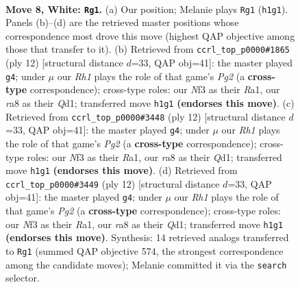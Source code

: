 \documentclass[11pt]{article}
\begin{document}
\begin{figure}[p]\centering
\begin{subfigure}{0.46\textwidth}\centering
\resizebox{\linewidth}{!}{%
\newchessgame
\chessboard[
  setfen={rnbqk2r/pp2bpp1/4pn2/2Pp3p/3P4/2N2N2/PP3PPP/R1BQKB1R w KQkq - 0 8},
  showmover=false,
  pgfstyle=straightmove, color=movearrow, markmove={h1-g1}
]}
\caption{}
\end{subfigure}\hfill
\begin{subfigure}{0.46\textwidth}\centering
\resizebox{\linewidth}{!}{%
\newchessgame
\chessboard[
  setfen={rnbqkb1r/1p3ppp/p2ppn2/8/3NP3/2N4P/PPP2PP1/R1BQKB1R w KQkq - 0 7},
  showmover=false,
  pgfstyle=straightmove, color=movearrow, markmove={g2-g4}
]}
\caption{}
\end{subfigure}
\\[4pt]
\begin{subfigure}{0.46\textwidth}\centering
\resizebox{\linewidth}{!}{%
\newchessgame
\chessboard[
  setfen={rnbqkb1r/1p3ppp/p2ppn2/8/3NP3/2N4P/PPP2PP1/R1BQKB1R w KQkq - 0 7},
  showmover=false,
  pgfstyle=straightmove, color=movearrow, markmove={g2-g4}
]}
\caption{}
\end{subfigure}\hfill
\begin{subfigure}{0.46\textwidth}\centering
\resizebox{\linewidth}{!}{%
\newchessgame
\chessboard[
  setfen={rnbqkb1r/1p3ppp/p2ppn2/8/3NP3/2N4P/PPP2PP1/R1BQKB1R w KQkq - 0 7},
  showmover=false,
  pgfstyle=straightmove, color=movearrow, markmove={g2-g4}
]}
\caption{}
\end{subfigure}
\caption{\textbf{Move 8, White: \texttt{Rg1}.} (a) Our position; Melanie plays \texttt{Rg1} (\texttt{h1g1}). Panels (b)--(d) are the retrieved master positions whose correspondence most drove this move (highest QAP objective among those that transfer to it). (b) Retrieved from \texttt{ccrl\_top\_p0000\#1865} (ply 12) [structural distance $d$=33, QAP obj=41]: the master played \texttt{g4}; under $\mu$ our \emph{Rh1} plays the role of that game's \emph{Pg2} (a \textbf{cross-type} correspondence); cross-type roles: our \emph{N}f3 as their \emph{R}a1, our \emph{r}a8 as their \emph{Q}d1; transferred move \texttt{h1g1} \textbf{(endorses this move)}. (c) Retrieved from \texttt{ccrl\_top\_p0000\#3448} (ply 12) [structural distance $d$=33, QAP obj=41]: the master played \texttt{g4}; under $\mu$ our \emph{Rh1} plays the role of that game's \emph{Pg2} (a \textbf{cross-type} correspondence); cross-type roles: our \emph{N}f3 as their \emph{R}a1, our \emph{r}a8 as their \emph{Q}d1; transferred move \texttt{h1g1} \textbf{(endorses this move)}. (d) Retrieved from \texttt{ccrl\_top\_p0000\#3449} (ply 12) [structural distance $d$=33, QAP obj=41]: the master played \texttt{g4}; under $\mu$ our \emph{Rh1} plays the role of that game's \emph{Pg2} (a \textbf{cross-type} correspondence); cross-type roles: our \emph{N}f3 as their \emph{R}a1, our \emph{r}a8 as their \emph{Q}d1; transferred move \texttt{h1g1} \textbf{(endorses this move)}. Synthesis: 14 retrieved analogs transferred to \texttt{Rg1} (summed QAP objective 574, the strongest correspondence among the candidate moves); Melanie committed it via the \texttt{search} selector.}
\label{fig:thought-m14}
\end{figure}
\end{document}
